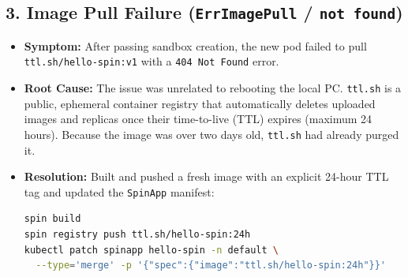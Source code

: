 \documentclass[11pt,a4paper]{article}
\begin{document}
    \subsection{3. Image Pull Failure (\texttt{ErrImagePull} / \texttt{not found})}\label{subsec:3.-image-pull-failure-(texttt{errimagepull}-/-texttt{not-found})}
    \begin{itemize}[leftmargin=*]
    \item \textbf{Symptom:} After passing sandbox creation, the new pod failed to pull \texttt{ttl.sh/hello-spin:v1} with a \texttt{404 Not Found} error.
    \item \textbf{Root Cause:} The issue was unrelated to rebooting the local PC. \texttt{ttl.sh} is a public, ephemeral container registry that automatically deletes uploaded images and replicas once their time-to-live (TTL) expires (maximum 24 hours). Because the image was over two days old, \texttt{ttl.sh} had already purged it.
    \item \textbf{Resolution:} Built and pushed a fresh image with an explicit 24-hour TTL tag and updated the \texttt{SpinApp} manifest:
    \begin{lstlisting}[language=bash,label={lst:lstlisting3}]
spin build
spin registry push ttl.sh/hello-spin:24h
kubectl patch spinapp hello-spin -n default \
  --type='merge' -p '{"spec":{"image":"ttl.sh/hello-spin:24h"}}'
    \end{lstlisting}
    \end{itemize}
\end{document}
